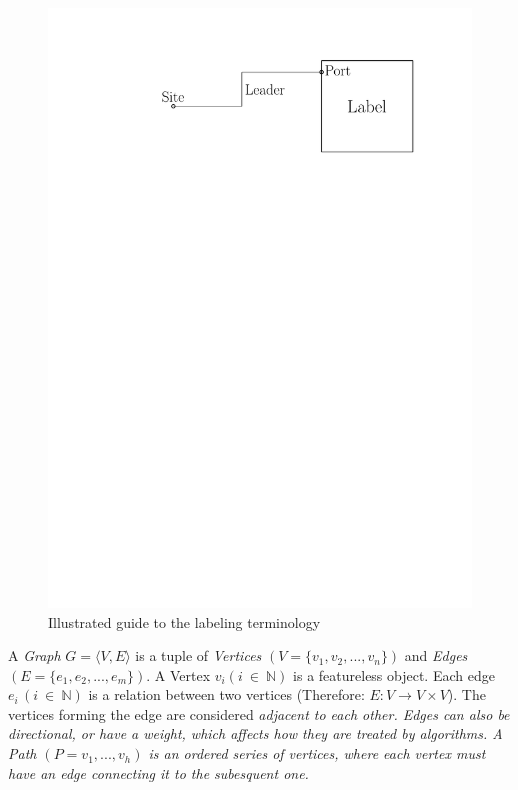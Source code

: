 \documentclass[11pt,a4paper]{vutinfth}
\begin{document}
\begin{figure}%
 \captionsetup{justification=centering, margin=0.75cm}
 \centering
  \includegraphics[scale=0.5]{IPE_TerminologyDrawing.pdf}
  \caption{Illustrated guide to the labeling terminology}
 \label{fig:term}
\end{figure}

A \emph{Graph} $G=\langle V, E \rangle$ is a tuple of \emph{Vertices} $(V=\{v_1, v_2, ..., v_n\})$ and \emph{Edges} $(E=\{e_1, e_2, ..., e_m\})$. A Vertex $v_i (i~\in~\mathbb{N})$ is a featureless object. %
 Each edge $e_i \, (i~\in~\mathbb{N})$ is a relation between two vertices (Therefore: $E:V\rightarrow  V\times V$). The vertices forming the edge are considered \em{adjacent} to each other. Edges can also be directional, or have a weight, which affects how they are treated by algorithms.
 A \em{Path} $(P=v_1, ..., v_h)$ is an ordered series of vertices, where each vertex must have an edge connecting it to the subesquent one.
\end{document}

